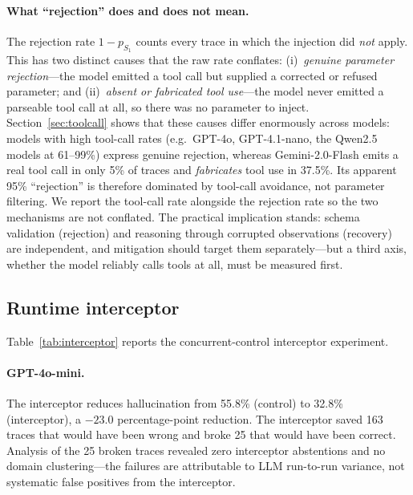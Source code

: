 \documentclass{article}
\begin{document}
\paragraph{What ``rejection'' does and does not mean.}
The rejection rate $1{-}p_{S_1}$ counts every trace in which the injection did
\emph{not} apply. This has two distinct causes that the raw rate conflates:
(i)~\emph{genuine parameter rejection}---the model emitted a tool call but
supplied a corrected or refused parameter; and (ii)~\emph{absent or fabricated
tool use}---the model never emitted a parseable tool call at all, so there was
no parameter to inject. Section~\ref{sec:toolcall} shows that these causes
differ enormously across models: models with high tool-call rates
(e.g.\ GPT-4o, GPT-4.1-nano, the Qwen2.5 models at 61--99\%) express genuine
rejection, whereas Gemini-2.0-Flash emits a real tool call in only 5\% of
traces and \emph{fabricates} tool use in 37.5\%. Its apparent 95\% ``rejection''
is therefore dominated by tool-call avoidance, not parameter filtering. We
report the tool-call rate alongside the rejection rate so the two mechanisms
are not conflated. The practical implication stands: schema validation
(rejection) and reasoning through corrupted observations (recovery) are
independent, and mitigation should target them separately---but a third axis,
whether the model reliably calls tools at all, must be measured first.

\subsection{Runtime interceptor}
\label{sec:interceptor}

Table~\ref{tab:interceptor} reports the concurrent-control interceptor
experiment.



\paragraph{GPT-4o-mini.}
The interceptor reduces hallucination from 55.8\% (control) to 32.8\%
(interceptor), a $-23.0$ percentage-point reduction.
The interceptor saved 163 traces that would have been wrong and broke
25 that would have been correct.
Analysis of the 25 broken traces revealed zero interceptor abstentions
and no domain clustering---the failures are attributable to LLM
run-to-run variance, not systematic false positives from the
interceptor.
\end{document}
